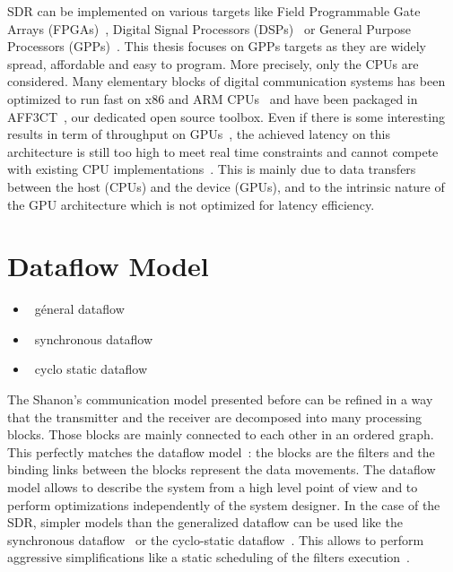 SDR can be implemented on various targets like Field Programmable Gate Arrays
(FPGAs)~\cite{Coulton2004,Skey2006,Dutta2010,Shaik2013,Maheshwarappa2015,
Nivin2016}, Digital Signal Processors (DSPs)~\cite{Kaur2008,Karlsson2013,
Shaik2013} or General Purpose Processors (GPPs)~\cite{Yoge2012,Bang2014,
Meshram2019,Grayver2020}. This thesis focuses on GPPs targets as they are widely
spread, affordable and easy to program. More precisely, only the CPUs are
considered. Many elementary blocks of digital communication systems has been
optimized to run fast on x86 and ARM CPUs~\cite{Cassagne2015c,Cassagne2016a,
Cassagne2016b,Cassagne2018,Leonardon2019,Ghaffari2019} and have been packaged in
AFF3CT~\cite{Cassagne2017a,Cassagne2019a}, our dedicated open source toolbox.
Even if there is some interesting results in term of throughput on
GPUs~\cite{Xianjun2013,Li2014,LeGal2014a,Giard2016b,Keskin2017a}, the achieved
latency on this architecture is still too high to meet real time constraints and
cannot compete with existing CPU implementations~\cite{LeGal2015a,Cassagne2015c,
Giard2016b,Cassagne2016a,LeGal2017,Leonardon2019,LeGal2019a}. This is mainly due
to data transfers between the host (CPUs) and the device (GPUs), and to the
intrinsic nature of the GPU architecture which is not optimized for latency
efficiency.

\section{Dataflow Model}

\begin{itemize}
  \item \xmark~géneral dataflow
  \item \xmark~synchronous dataflow
  \item \xmark~cyclo static dataflow
\end{itemize}

The Shanon's communication model presented before can be refined in a way
that the transmitter and the receiver are decomposed into many processing
blocks. Those blocks are mainly connected to each other in an ordered graph.
This perfectly matches the dataflow model~\cite{Dennis1980,Ackerman1982}: the
blocks are the filters and the binding links between the blocks represent the
data movements. The dataflow model allows to describe the system from a high
level point of view and to perform optimizations independently of the system
designer. In the case of the SDR, simpler models than the generalized dataflow
can be used like the synchronous dataflow~\cite{Lee1987} or the cyclo-static
dataflow~\cite{Engels1994,Bilsen1995}. This allows to perform aggressive
simplifications like a static scheduling of the filters
execution~\cite{Parks1995}.

